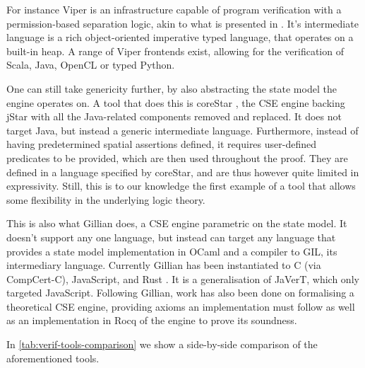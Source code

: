 For instance Viper \cite{viper} is an infrastructure capable of program verification with a permission-based separation logic, akin to what is presented in \cite{fracpermissions}. It's intermediate language is a rich object-oriented imperative typed language, that operates on a built-in heap. A range of Viper frontends exist, allowing for the verification of Scala, Java, OpenCL or typed Python.

One can still take genericity further, by also abstracting the state model the engine operates on. A tool that does this is coreStar \cite{corestar}, the CSE engine backing jStar with all the Java-related components removed and replaced. It does not target Java, but instead a generic intermediate language. Furthermore, instead of having predetermined spatial assertions defined, it requires user-defined predicates to be provided, which are then used throughout the proof. They are defined in a language specified by coreStar, and are thus however quite limited in expressivity. Still, this is to our knowledge the first example of a tool that allows some flexibility in the underlying logic theory.

This is also what Gillian \cite{gillian0, gillian1, gillian2, sacha-phd} does, a CSE engine parametric on the state model. It doesn't support any one language, but instead can target any language that provides a state model implementation in OCaml and a compiler to GIL, its intermediary language. Currently Gillian has been instantiated to C (via CompCert-C), JavaScript, and Rust \cite{gillianrust}. It is a generalisation of JaVerT, which only targeted JavaScript. Following Gillian, work has also been done on formalising a theoretical CSE engine, providing axioms an implementation must follow \cite{cse1,cse2} as well as an implementation in Rocq of the engine to prove its soundness.

In \autoref{tab:verif-tools-comparison} we show a side-by-side comparison of the aforementioned tools.

